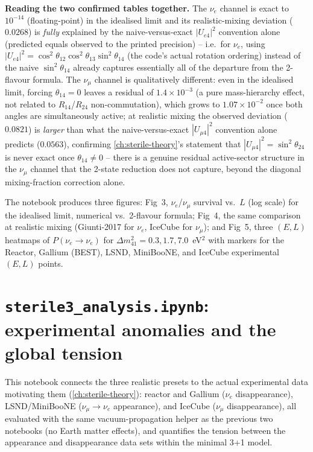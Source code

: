 \begin{notebox}
\textbf{Reading the two confirmed tables together.} The $\nu_e$ channel is
exact to $10^{-14}$ (floating-point) in the idealised limit and its
realistic-mixing deviation ($0.0268$) is \emph{fully} explained by the
naive-versus-exact $|U_{e4}|^2$ convention alone (predicted equals
observed to the printed precision) -- i.e.\ for $\nu_e$, using
$|U_{e4}|^2=\cos^2\theta_{12}\cos^2\theta_{13}\sin^2\theta_{14}$ (the code's
actual rotation ordering) instead of the naive $\sin^2\theta_{14}$ already
captures essentially all of the departure from the 2-flavour formula. The
$\nu_\mu$ channel is qualitatively different: even in the idealised limit,
forcing $\theta_{14}=0$ leaves a residual of $1.4\times10^{-3}$ (a pure
mass-hierarchy effect, not related to $R_{14}$/$R_{24}$ non-commutation),
which grows to $1.07\times10^{-2}$ once both angles are simultaneously
active; at realistic mixing the observed deviation ($0.0821$) is
\emph{larger} than what the naive-versus-exact $|U_{\mu4}|^2$ convention
alone predicts ($0.0563$), confirming
\cref{ch:sterile-theory}'s statement that $|U_{\mu4}|^2=\sin^2\theta_{24}$
is never exact once $\theta_{14}\neq0$ -- there is a genuine residual
active-sector structure in the $\nu_\mu$ channel that the 2-state reduction
does not capture, beyond the diagonal mixing-fraction correction alone.
\end{notebox}

The notebook produces three figures: Fig~3, $\nu_e$/$\nu_\mu$ survival vs.\
$L$ (log scale) for the idealised limit, numerical vs.\ 2-flavour formula;
Fig~4, the same comparison at realistic mixing (Giunti-2017 for $\nu_e$,
IceCube for $\nu_\mu$); and Fig~5, three $(E,L)$ heatmaps of
$P(\nu_e\to\nu_e)$ for $\Delta m^2_{41}=0.3,1.7,7.0$~eV$^2$ with markers
for the Reactor, Gallium (BEST), LSND, MiniBooNE, and IceCube experimental
$(E,L)$ points.

\section{\texttt{sterile3\_analysis.ipynb}: experimental anomalies and the global tension}

\begin{implbox}
This notebook connects the three realistic presets to the actual
experimental data motivating them (\cref{ch:sterile-theory}): reactor and
Gallium ($\nu_e$ disappearance), LSND/MiniBooNE ($\nu_\mu\to\nu_e$
appearance), and IceCube ($\nu_\mu$ disappearance), all evaluated with the
same vacuum-propagation helper as the previous two notebooks (no Earth
matter effects), and quantifies the tension between the appearance and
disappearance data sets within the minimal 3+1 model.
\end{implbox}

